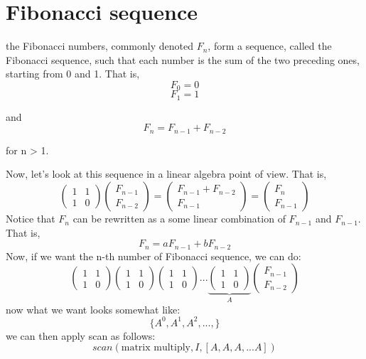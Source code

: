 \documentclass[12pt]{article}
\begin{document}
\section{Fibonacci sequence }
\begin{definition}
the Fibonacci numbers, commonly denoted $F_n$, form a sequence, called the Fibonacci sequence, such that each number is the sum of the two preceding ones, starting from 0 and 1. That is,
$$F_0 = 0$$
$$F_1= 1$$

and 
$$F_n = F_{n-1} + F_{n-2}$$

for n > 1.
\end{definition}{}
Now, let's look at this sequence in a linear algebra point of view. That is,\\
$$
\begin{pmatrix}
1 &1 \\
1 &0
\end{pmatrix}
\begin{pmatrix}
F_{n-1} \\
F_{n-2}
\end{pmatrix}
=
\begin{pmatrix}
F_{n-1} + F_{n-2}\\
F_{n-1}
\end{pmatrix}
=\begin{pmatrix}
F_n\\
F_{n-1}
\end{pmatrix}
$$
Notice that $F_n$ can be rewritten as a some linear combination of $F_{n-1}$ and $F_{n-1}$. That is,
$$F_n = aF_{n-1} + bF_{n-2}$$
Now, if we want the n-th number of Fibonacci sequence, we can do:
$$
\begin{pmatrix}
1 &1 \\
1 &0
\end{pmatrix}
\begin{pmatrix}
1 &1 \\
1 &0
\end{pmatrix}
\begin{pmatrix}
1 &1 \\
1 &0
\end{pmatrix}
...
\underbrace{
\begin{pmatrix}
1 &1 \\
1 &0
\end{pmatrix}
}_{A}
\begin{pmatrix}
F_{n-1} \\
F_{n-2}
\end{pmatrix}
$$
now what we want looks somewhat like:
$$\{A^0, A^1,A^2, ... , \}$$
we can then apply scan as follows:
$$scan(\text{matrix multiply}, I, [A,A,A,...A]) $$
\end{document}

